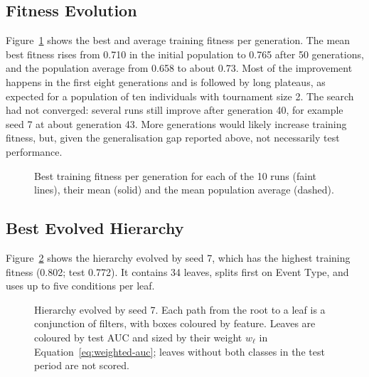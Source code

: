\subsection{Fitness Evolution}

Figure~\ref{fig:fitness} shows the best and average training fitness per generation.
The mean best fitness rises from 0.710 in the initial population to 0.765 after 50 generations, and the population average from 0.658 to about 0.73.
Most of the improvement happens in the first eight generations and is followed by long plateaus, as expected for a population of ten individuals with tournament size 2.
The search had not converged: several runs still improve after generation 40, for example seed 7 at about generation 43.
More generations would likely increase training fitness, but, given the generalisation gap reported above, not necessarily test performance.

\begin{figure}[htbp]
    \centering
    \caption[Fitness evolution]{Best training fitness per generation for each of the 10 runs (faint lines), their mean (solid) and the mean population average (dashed).}
    \label{fig:fitness}
\end{figure}

\subsection{Best Evolved Hierarchy}

Figure~\ref{fig:phenotype-tree} shows the hierarchy evolved by seed 7, which has the highest training fitness (0.802; test 0.772).
It contains 34 leaves, splits first on Event Type, and uses up to five conditions per leaf.

\begin{figure}[htbp]
    \centering
    \caption[Best evolved hierarchy (seed 7)]{Hierarchy evolved by seed 7. Each path from the root to a leaf is a conjunction of filters, with boxes coloured by feature. Leaves are coloured by test \ac{AUC} and sized by their weight $w_\ell$ in Equation~\ref{eq:weighted-auc}; leaves without both classes in the test period are not scored.}
    \label{fig:phenotype-tree}
\end{figure}

